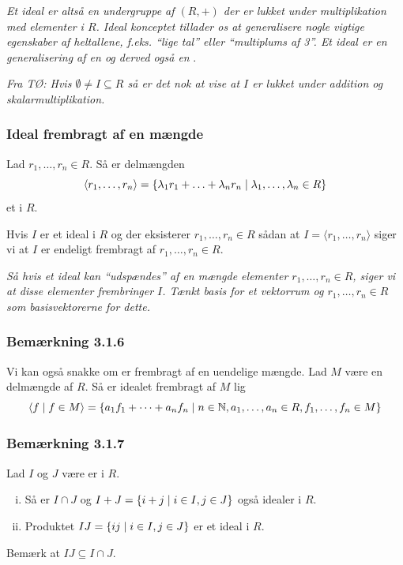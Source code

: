 \textit{Et ideal er altså en undergruppe af $(R, +)$ der er lukket under
multiplikation med elementer i $R$. Ideal konceptet tillader os at generalisere
nogle vigtige egenskaber af heltallene, f.eks. ``lige tal'' eller ``multiplums af
3''. Et ideal er en generalisering af en  og derved også en
}.

\textit{Fra TØ: Hvis $\emptyset \neq I \subseteq R$ så er det nok at vise at
$I$ er lukket under addition og skalarmultiplikation.}

\subsubsection{Ideal frembragt af en mængde}
\label{Ideal frembragt af en maengde}
Lad $r_1, \ldots, r_n \in R$. Så er delmængden
\begin{equation*}
  \langle r_1,\ldots,r_n \rangle = \{ \lambda_1 r_1 + \ldots + \lambda_n
  r_n \mid \lambda_1,\ldots, \lambda_n \in R \}
\end{equation*}
et  i $R$.

Hvis $I$ er et ideal i $R$ og der eksisterer $r_1,\ldots,r_n \in R$ sådan at $I
= \langle r_1,\ldots,r_n \rangle$ siger vi at $I$ er endeligt frembragt af
$r_1,\ldots,r_n \in R$.

\textit{Så hvis et ideal kan ``udspændes'' af en mængde elementer
$r_1,\ldots,r_n \in R$, siger vi at disse elementer frembringer $I$. Tænkt
basis for et vektorrum og $r_1,\ldots,r_n \in R$ som basisvektorerne for dette.}

\subsubsection{Bemærkning 3.1.6}
\label{Bemaerkning 3.1.6}
Vi kan også snakke om er frembragt af en uendelige mængde. Lad
$M$ være en delmængde af $R$. Så er idealet frembragt af $M$ lig
\begin{equation*}
  \langle f \mid f \in M \rangle = \{ a_1 f_1 + \cdots + a_n f_n \mid n \in
  \mathbb{N}, a_1,\ldots,a_n \in R, f_1,\ldots,f_n \in M \}
\end{equation*}

\subsubsection{Bemærkning 3.1.7}
\label{Bemaerkning 3.1.7}
Lad $I$ og $J$ være er i $R$.
\begin{enumerate}[(i)]
  \item Så er $I \cap J$ og $I + J = \{ i + j \mid i \in I, j \in J \}$ også
  idealer i $R$.
  \item Produktet $IJ = \{ ij \mid i \in I, j \in J \}$ er et ideal i $R$.
\end{enumerate}
Bemærk at $IJ \subseteq I \cap J$.

